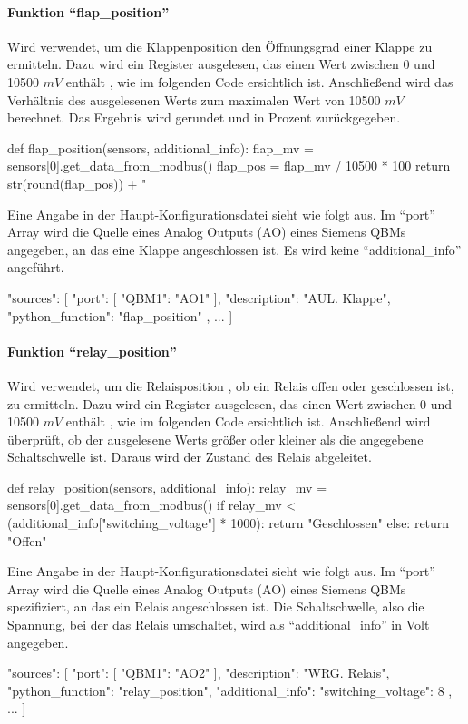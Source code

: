 \paragraph{Funktion \enquote{flap\_position}}
Wird verwendet, um die Klappenposition \bzw den Öffnungsgrad einer Klappe zu ermitteln. 
Dazu wird ein Register ausgelesen, das einen Wert zwischen 0 und 10500 $mV$ enthält \cite[vgl.][17]{siemens:2021}, wie im folgenden Code ersichtlich ist. Anschließend wird das Verhältnis des ausgelesenen Werts zum maximalen Wert von 10500 $mV$ berechnet. Das Ergebnis wird gerundet und in Prozent zurückgegeben.

\begin{pythoncode}
def flap_position(sensors, additional_info):
	flap_mv = sensors[0].get_data_from_modbus()
	flap_pos = flap_mv / 10500 * 100
	return str(round(flap_pos)) + " %
\end{pythoncode}

Eine Angabe in der Haupt-Konfigurationsdatei sieht wie folgt aus. Im \enquote{port} Array wird die Quelle eines Analog Outputs (AO) eines Siemens QBMs angegeben, an das eine Klappe angeschlossen ist. Es wird keine \enquote{additional\_info} angeführt.

\begin{jsoncode}
"sources": [
	{
		"port": [
			{"QBM1": "AO1"}
		],
		"description": "AUL. Klappe",
		"python_function": "flap_position"
	},
	...
]
\end{jsoncode}



\paragraph{Funktion \enquote{relay\_position}}
Wird verwendet, um die Relaisposition \bzw, ob ein Relais offen oder geschlossen ist, zu ermitteln. Dazu wird ein Register ausgelesen, das einen Wert zwischen 0 und 10500 $mV$ enthält \cite[vgl.][17]{siemens:2021}, wie im folgenden Code ersichtlich ist. Anschließend wird überprüft, ob der ausgelesene Werts größer oder kleiner als die angegebene Schaltschwelle ist. Daraus wird der Zustand des Relais abgeleitet.

\begin{pythoncode}
def relay_position(sensors, additional_info):
	relay_mv = sensors[0].get_data_from_modbus()
	if relay_mv < (additional_info["switching_voltage"] * 1000):
		return "Geschlossen"
	else:
		return "Offen"

\end{pythoncode}

Eine Angabe in der Haupt-Konfigurationsdatei sieht wie folgt aus. Im \enquote{port} Array wird die Quelle eines Analog Outputs (AO) eines Siemens QBMs spezifiziert, an das ein Relais angeschlossen ist. Die Schaltschwelle, also die Spannung, bei der das Relais umschaltet, wird als \enquote{additional\_info} in Volt angegeben.

\begin{jsoncode}
"sources": [
	{
		"port": [
			{"QBM1": "AO2"}
		],
		"description": "WRG. Relais",
		"python_function": "relay_position",
		"additional_info": {"switching_voltage": 8}
	},
	...
]
\end{jsoncode}
